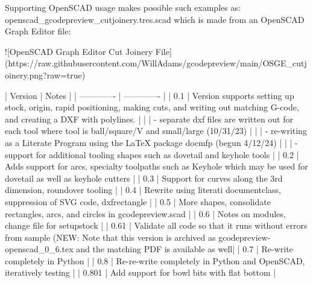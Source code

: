 \documentclass{ltxdoc}
\begin{document}
\begin{readme}
Supporting OpenSCAD usage makes possible such examples as: openscad_gcodepreview_cutjoinery.tres.scad which is made from an OpenSCAD Graph Editor file:

![OpenSCAD Graph Editor Cut Joinery File](https://raw.githubusercontent.com/WillAdams/gcodepreview/main/OSGE_cutjoinery.png?raw=true)

| Version       | Notes         |
| ------------- | ------------- |
| 0.1           | Version  supports setting up stock, origin, rapid positioning, making cuts, and writing out matching G-code, and creating a DXF with polylines.                                 |
|               |  - separate dxf files are written out for each tool where tool is ball/square/V and small/large (10/31/23)                                                                      |
|               |  - re-writing as a Literate Program using the LaTeX package docmfp (begun 4/12/24)                                                                                              |
|               |  - support for additional tooling shapes such as dovetail and keyhole tools                                                                                                     |
| 0.2           | Adds support for arcs, specialty toolpaths such as Keyhole which may be used for dovetail as well as keyhole cutters                                                            |
| 0.3           | Support for curves along the 3rd dimension, roundover tooling                                                                                                                   |
| 0.4           | Rewrite using literati documentclass, suppression of SVG code, dxfrectangle                                                                                                     |
| 0.5           | More shapes, consolidate rectangles, arcs, and circles in gcodepreview.scad                                                                                                     |
| 0.6           | Notes on modules, change file for setupstock                                                                                                                                    |
| 0.61          | Validate all code so that it runs without errors from sample (NEW: Note that this version is archived as gcodepreview-openscad_0_6.tex and the matching PDF is available as well|
| 0.7           | Re-write completely in Python                                                                                                                                                   |
| 0.8           | Re-re-write completely in Python and OpenSCAD, iteratively testing                                                                                                              |
| 0.801         | Add support for bowl bits with flat bottom                                                                                                                                      |


\end{readme}
\end{document}
